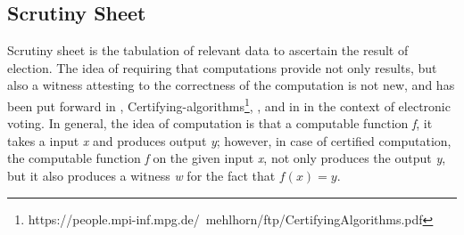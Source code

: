   
    
%   
%   	
%    
%    
%		
%	  
%       
       
%       
%     
%   	 
  
	       
    
   \subsection{Scrutiny Sheet}
   Scrutiny sheet is the tabulation of relevant data to ascertain the result of election. 
   The idea of requiring that computations provide not only results, but also a witness attesting
    to the correctness of the computation is not new,
	and has been put forward in \citep{89397},  
	Certifying-algorithms\footnote{https://people.mpi-inf.mpg.de/~mehlhorn/ftp/CertifyingAlgorithms.pdf},
	\cite{Arkoudas:2005:DRC}, and in \cite{Schurmann:2009:EET} in the context
	of electronic voting.   In general, the idea of computation is that a computable function \textit{f}, it takes 
	a input \textit{x} and produces output \textit{y}; however, in case of certified computation, 
	the computable function \textit{f} on the given input \textit{x}, not only produces the output \textit{y},
	but it also produces a witness \textit{w} for the fact that $ f (x) = y$.
	
	


